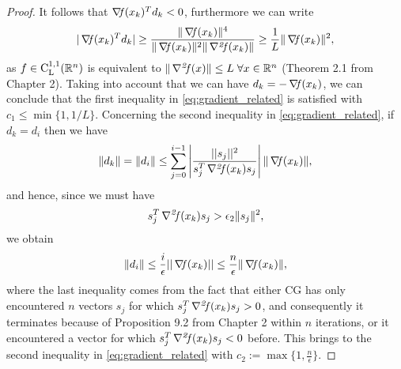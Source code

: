 \documentclass[10pt,a4paper]{article}
\begin{document}
\begin{proof}
It follows that $\operatorname*{\mathit{\nabla \!f}}(x_k)^T d_k < 0$, furthermore we can write
\begin{equation*}
|\operatorname*{\mathit{\nabla \!f}}(x_k)^T d_k| \geq \frac{\|\operatorname*{\mathit{\nabla \!f}}(x_k)\|^4}{\|\operatorname*{\mathit{\nabla \!f}}(x_k)\|^2 \|\operatorname*{\mathit{\nabla^2 \!f}}(x_k)\|} \geq \frac{1}{L} \|\operatorname*{\mathit{\nabla \!f}}(x_k)\|^2,
\end{equation*}
as $f\in \mathord{\mathrm{C^{1,1}_{L}}}(\mathbb{R}^n)$ is equivalent to $\|\operatorname*{\mathit{\nabla^2 \!f}}(x)\|\leq L \; \forall x\in \mathbb{R}^n$ (Theorem 2.1 from Chapter 2). Taking into account that we can have $d_k = -\operatorname*{\mathit{\nabla \!f}}(x_k)$, we can conclude that the first inequality in \eqref{eq:gradient_related} is satisfied with $c_1 \leq \min\{1, 1/L\}$. Concerning the second inequality in \eqref{eq:gradient_related}, if $d_k = d_i$ then we have
\begin{equation*}
\|d_k\| = \|d_i\| \leq \sum_{j=0}^{i-1} \left|\frac{||s_j||^2}{s_j^T \operatorname*{\mathit{\nabla^2 \!f}}(x_k) s_j}\right| \|\operatorname*{\mathit{\nabla \!f}}(x_k)\|,
\end{equation*}
and hence, since we must have
\begin{equation*}
s_j^T \operatorname*{\mathit{\nabla^2 \!f}}(x_k) s_j > \epsilon_2 \|s_j\|^2,
\end{equation*}
we obtain 
$$\|d_i\|\leq \frac{i}{\epsilon}||\operatorname*{\mathit{\nabla \!f}}(x_k)||\leq\frac{n}{\epsilon} \|\operatorname*{\mathit{\nabla \!f}}(x_k)\|,$$
where the last inequality comes from the fact that either CG has only encountered $n$ vectors $s_j$ for which $s_j^T \operatorname*{\mathit{\nabla^2 \!f}}(x_k) s_j >0$, and consequently it terminates because of Proposition 9.2 from Chapter 2 within $n$ iterations, or it encountered a vector for which $s_j^T \operatorname*{\mathit{\nabla^2 \!f}}(x_k) s_j<0$ before. This brings to the second inequality in \eqref{eq:gradient_related} with $c_2:=\max\{1,\frac{n}{\epsilon}\}$.
\end{proof}
\end{document}

